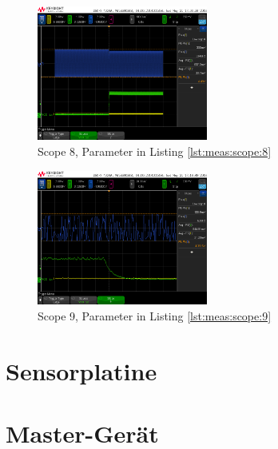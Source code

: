 \begin{figure}[h!tb]
    \centering
    \includegraphics[width=0.5\textwidth]{images/scopeShots/scope_8.png}
    \caption{Scope 8, Parameter in Listing \ref{lst:meas:scope:8}}
    \label{fig:meas:scope:8}
\end{figure}

\begin{figure}[h!tb]
    \centering
    \includegraphics[width=0.5\textwidth]{images/scopeShots/scope_9.png}
    \caption{Scope 9, Parameter in Listing \ref{lst:meas:scope:9}}
    \label{fig:meas:scope:9}
\end{figure}

\clearpage
\section{Sensorplatine}
\label{sec:validierung:sensorplatine}


\section{Master-Ger\"at}
\label{sec:validierung:master}
